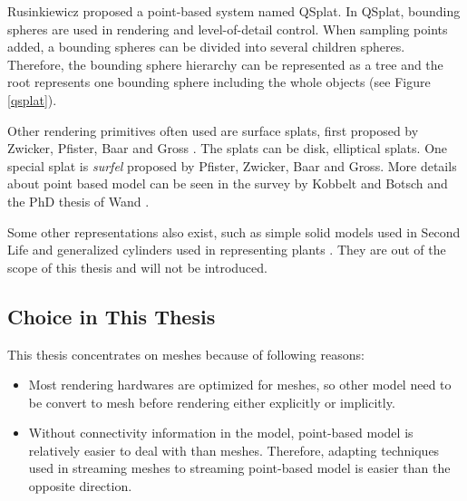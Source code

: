 \documentclass[11pt, a4paper]{report}
\begin{document}
    Rusinkiewicz \cite{rusinkiewicz:qsplat, 364350} proposed a point-based system named QSplat. 
    In QSplat, bounding spheres are used in rendering and level-of-detail control. 
    When sampling points added, a bounding spheres can be divided into several children spheres. 
    Therefore, the bounding sphere hierarchy can be represented as a tree
    and the root represents one bounding sphere including the whole objects (see Figure \ref{qsplat}).

    Other rendering primitives often used are surface splats, 
    first proposed by Zwicker, Pfister, Baar and Gross \cite{383300}. 
    The splats can be disk, elliptical splats. 
    One special splat is \emph{surfel} proposed by Pfister, Zwicker, Baar and Gross\cite{344936}.
    More details about point based model can be seen in the survey by Kobbelt and Botsch \cite{DBLP:journals/cg/KobbeltB04} 
    and the PhD thesis of Wand \cite{wand:point}.  

    Some other representations also exist, such as simple solid models used in Second Life
    and generalized cylinders used in representing plants \cite{plant:seb, compact:mondet}.
    They are out of the scope of this thesis and will not be introduced.
    \subsection{Choice in This Thesis}
    This thesis concentrates on meshes because of following reasons:
    \begin{itemize}
        \item Most rendering hardwares are optimized for meshes, so other model need to be convert
            to mesh before rendering either explicitly or implicitly. 
        \item Without connectivity information in the model, point-based model is relatively easier to deal with
            than meshes. Therefore, adapting techniques used in streaming meshes to streaming point-based model
            is easier than the opposite direction.
    \end{itemize}
\end{document}

